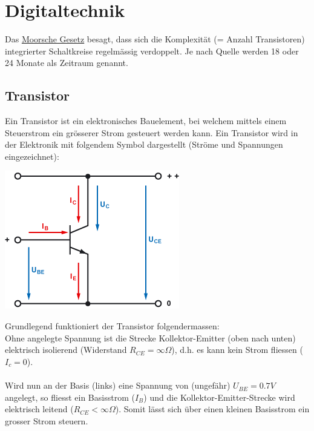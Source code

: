 \documentclass{report}
\begin{document}
\chapter{Digitaltechnik}
Das \underline{Moorsche Gesetz} besagt, dass sich die Komplexität (= Anzahl Transistoren) integrierter Schaltkreise regelmässig verdoppelt. Je nach Quelle werden 18 oder 24 Monate als Zeitraum genannt.
\section{Transistor}
Ein Transistor ist ein elektronisches Bauelement, bei welchem mittels einem Steuerstrom ein grösserer Strom gesteuert werden kann. Ein Transistor wird in der Elektronik mit folgendem Symbol dargestellt (Ströme und Spannungen eingezeichnet):
\begin{center}\includegraphics[scale=0.4]{img/transistor.png}\end{center}
Grundlegend funktioniert der Transistor folgendermassen:\\
Ohne angelegte Spannung ist die Strecke Kollektor-Emitter (oben nach unten) elektrisch isolierend (Widerstand $R_{CE} = \infty \Omega$), d.h. es kann kein Strom fliessen ($I_c = 0$).
\\\\Wird nun an der Basis (links) eine Spannung von (ungefähr) $U_{BE} =0.7V$ angelegt, so fliesst ein Basisstrom ($I_B$) und die Kollektor-Emitter-Strecke wird elektrisch leitend ($R_{CE} < \infty \Omega$). Somit lässt sich über einen kleinen Basisstrom ein grosser Strom steuern.
\end{document}
